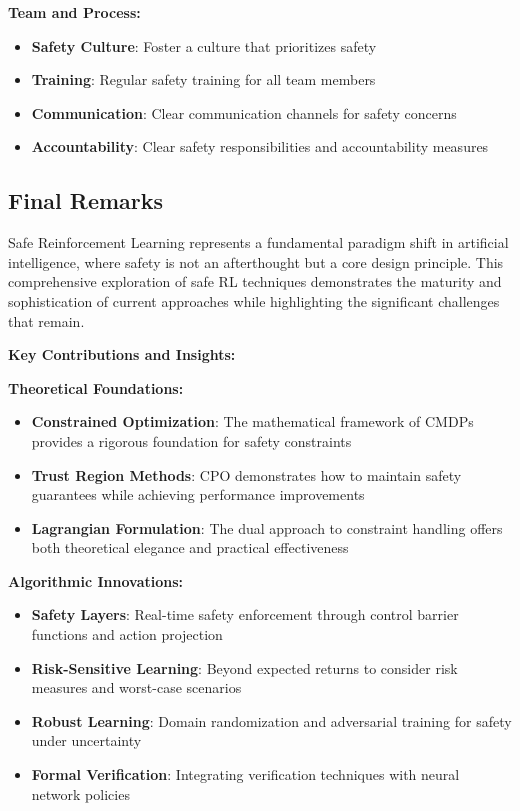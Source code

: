 \documentclass[12pt]{article}
\begin{document}
{{{{\textbf{Team and Process:}
\begin{itemize}
\item \textbf{Safety Culture}: Foster a culture that prioritizes safety
\item \textbf{Training}: Regular safety training for all team members
\item \textbf{Communication}: Clear communication channels for safety concerns
\item \textbf{Accountability}: Clear safety responsibilities and accountability measures
\end{itemize}

\subsection{Final Remarks}

Safe Reinforcement Learning represents a fundamental paradigm shift in artificial intelligence, where safety is not an afterthought but a core design principle. This comprehensive exploration of safe RL techniques demonstrates the maturity and sophistication of current approaches while highlighting the significant challenges that remain.

\textbf{Key Contributions and Insights:}

\textbf{Theoretical Foundations:}
\begin{itemize}
\item \textbf{Constrained Optimization}: The mathematical framework of CMDPs provides a rigorous foundation for safety constraints
\item \textbf{Trust Region Methods}: CPO demonstrates how to maintain safety guarantees while achieving performance improvements
\item \textbf{Lagrangian Formulation}: The dual approach to constraint handling offers both theoretical elegance and practical effectiveness
\end{itemize}

\textbf{Algorithmic Innovations:}
\begin{itemize}
\item \textbf{Safety Layers}: Real-time safety enforcement through control barrier functions and action projection
\item \textbf{Risk-Sensitive Learning}: Beyond expected returns to consider risk measures and worst-case scenarios
\item \textbf{Robust Learning}: Domain randomization and adversarial training for safety under uncertainty
\item \textbf{Formal Verification}: Integrating verification techniques with neural network policies
\end{itemize}

}}}}
\end{document}

